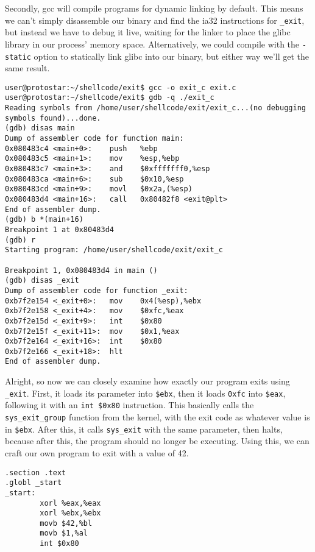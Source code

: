 Secondly, gcc will compile programs for dynamic linking by default. This means we can't
simply disassemble our binary and find the ia32 instructions for \texttt{\_exit}, but
instead we have to debug it live, waiting for the linker to place the glibc library in
our process' memory space. Alternatively, we could compile with the \texttt{-static}
option to statically link glibc into our binary, but either way we'll get the same result.

\begin{lstlisting}
user@protostar:~/shellcode/exit$ gcc -o exit_c exit.c
user@protostar:~/shellcode/exit$ gdb -q ./exit_c
Reading symbols from /home/user/shellcode/exit/exit_c...(no debugging symbols found)...done.
(gdb) disas main
Dump of assembler code for function main:
0x080483c4 <main+0>:    push   %ebp
0x080483c5 <main+1>:    mov    %esp,%ebp
0x080483c7 <main+3>:    and    $0xfffffff0,%esp
0x080483ca <main+6>:    sub    $0x10,%esp
0x080483cd <main+9>:    movl   $0x2a,(%esp)
0x080483d4 <main+16>:   call   0x80482f8 <exit@plt>
End of assembler dump.
(gdb) b *(main+16)
Breakpoint 1 at 0x80483d4
(gdb) r
Starting program: /home/user/shellcode/exit/exit_c 

Breakpoint 1, 0x080483d4 in main ()
(gdb) disas _exit
Dump of assembler code for function _exit:
0xb7f2e154 <_exit+0>:   mov    0x4(%esp),%ebx
0xb7f2e158 <_exit+4>:   mov    $0xfc,%eax
0xb7f2e15d <_exit+9>:   int    $0x80
0xb7f2e15f <_exit+11>:  mov    $0x1,%eax
0xb7f2e164 <_exit+16>:  int    $0x80
0xb7f2e166 <_exit+18>:  hlt    
End of assembler dump.
\end{lstlisting}

Alright, so now we can closely examine how exactly our program exits using \texttt{\_exit}. First, it loads its
parameter into \texttt{\$ebx}, then it loads \texttt{0xfc} into \texttt{\$eax}, following it with an \texttt{int \$0x80}
instruction. This basically calls the \texttt{sys\_exit\_group} function from the kernel, with the exit
code as whatever value is in \texttt{\$ebx}. After this, it calls \texttt{sys\_exit} with the same parameter,
then halts, because after this, the program should no longer be executing. Using this, we can craft our
own program to exit with a value of 42.

\begin{lstlisting}
.section .text
.globl _start
_start:
        xorl %eax,%eax
        xorl %ebx,%ebx
        movb $42,%bl
        movb $1,%al
        int $0x80
\end{lstlisting}

